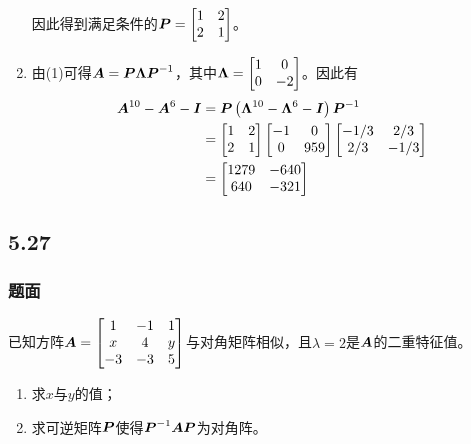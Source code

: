 \documentclass{beamer}
\begin{document}
\begin{frame}[allowframebreaks]
\begin{enumerate}
{              因此得到满足条件的\(\boldsymbol{P}=\begin{bmatrix}1&2\\2&1\end{bmatrix}\)。
              }
        \item {
              由(1)可得\(\boldsymbol{A}=\boldsymbol{P}\boldsymbol{\Lambda}{\boldsymbol{P}}^{-1}\)，其中\(\boldsymbol{\Lambda}=\begin{bmatrix}1&0\\0&-2\end{bmatrix}\)。因此有
              \begin{align*}
                  \boldsymbol{A}^{10}-\boldsymbol{A}^6-\boldsymbol{I} & =\boldsymbol{P}\left( \boldsymbol{\Lambda}^{10}-\boldsymbol{\Lambda}^6-\boldsymbol{I} \right){\boldsymbol{P}}^{-1}                                                                      \\
                                           & =\begin{bmatrix}1&2\\2&1\end{bmatrix}\begin{bmatrix}-1&0\\0&959\end{bmatrix}\begin{bmatrix}-1/3&2/3\\2/3&-1/3\end{bmatrix} \\
                                           & =\begin{bmatrix}1279&-640\\640&-321\end{bmatrix}
              \end{align*}
              }
    \end{enumerate}
\end{frame}

\subsection*{5.27}
\begin{frame}
    \frametitle{题面}
    已知方阵\(\boldsymbol{A}=\begin{bmatrix}1&-1&1\\x&4&y\\-3&-3&5\end{bmatrix}\)与对角矩阵相似，且\(\lambda=2\)是\(\boldsymbol{A}\)的二重特征值。
    \begin{enumerate}
        \item 求\(x\)与\(y\)的值；
        \item 求可逆矩阵\(\boldsymbol{P}\)使得\({\boldsymbol{P}}^{-1}\boldsymbol{A}\boldsymbol{P}\)为对角阵。
    \end{enumerate}
\end{frame}
\end{document}
